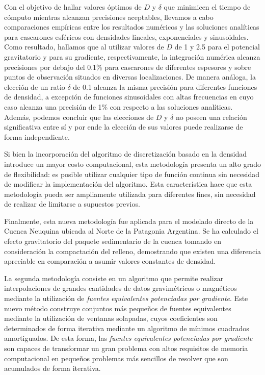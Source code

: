 Con el objetivo de hallar valores óptimos de $D$ y $\delta$ que minimicen el
tiempo de cómputo mientras alcanzan precisiones aceptables, llevamos a cabo
comparaciones empíricas entre los resultados numéricos y las soluciones
analíticas para cascarones esféricos con densidades lineales, exponenciales
y sinusoidales.
Como resultado, hallamos que al utilizar valores de $D$ de 1 y 2.5 para el
potencial gravitatorio y para su gradiente, respectivamente, la integración
numérica alcanza precisiones por debajo del 0.1\% para cascarones de diferentes
espesores y sobre puntos de observación situados en diversas localizaciones.
De manera análoga, la elección de un ratio $\delta$ de 0.1 alcanza la misma
precisión para diferentes funciones de densidad, a excepción de funciones
sinusoidales con altas frecuencias en cuyo caso alcanza una precisión de 1\%
con respecto a las soluciones analíticas.
Además, podemos concluir que las elecciones de $D$ y $\delta$ no poseen una
relación significativa entre sí y por ende la elección de sus valores puede
realizarse de forma independiente.

Si bien la incorporación del algoritmo de discretización basado en la densidad
introduce un mayor costo computacional, esta metodología presenta un alto grado
de flexibilidad: es posible utilizar cualquier tipo de función continua sin
necesidad de modificar la implementación del algoritmo.
Esta característica hace que esta metodología pueda ser ampliamente utilizada
para diferentes fines, sin necesidad de realizar de limitarse a supuestos
previos.

Finalmente, esta nueva metodología fue aplicada para el modelado directo de la
Cuenca Neuquina ubicada al Norte de la Patagonia Argentina.
Se ha calculado el efecto gravitatorio del paquete sedimentario de la cuenca
tomando en consideración la compactación del relleno, demostrando que existen
una diferencia apreciable en comparación a asumir valores constantes de
densidad.

\vspace{1em}

La segunda metodología consiste en un algoritmo que permite realizar
interpolaciones de grandes cantidades de datos gravimétricos o magnéticos
mediante la utilización de \emph{fuentes equivalentes potenciadas por
gradiente}.
Este nuevo método construye conjuntos más pequeños de fuentes equivalentes
mediante la utilización de ventanas solapadas, cuyos coeficientes son
determinados de forma iterativa mediante un algoritmo de mínimos cuadrados
amortiguados.
De esta forma, las \emph{fuentes equivalentes potenciadas por gradiente} son
capaces de transformar un gran problema con altos requisitos de memoria
computacional en pequeños problemas más sencillos de resolver que son
acumulados de forma iterativa.

